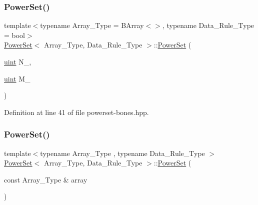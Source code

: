 \mbox{\label{class_power_set_abf6ac4224da7ae4d187d0d63833615b1}} 
\subsubsection{\texorpdfstring{Power\+Set()}{PowerSet()}\hspace{0.1cm}{\footnotesize\ttfamily [2/3]}}
{\footnotesize\ttfamily template$<$typename Array\+\_\+\+Type  = B\+Array$<$$>$, typename Data\+\_\+\+Rule\+\_\+\+Type  = bool$>$ \\
\hyperlink{class_power_set}{Power\+Set}$<$ Array\+\_\+\+Type, Data\+\_\+\+Rule\+\_\+\+Type $>$\+::\hyperlink{class_power_set}{Power\+Set} (\begin{DoxyParamCaption}\item[{\hyperlink{typedefs_8hpp_a91ad9478d81a7aaf2593e8d9c3d06a14}{uint}}]{N\+\_\+,  }\item[{\hyperlink{typedefs_8hpp_a91ad9478d81a7aaf2593e8d9c3d06a14}{uint}}]{M\+\_\+ }\end{DoxyParamCaption})\hspace{0.3cm}{\ttfamily [inline]}}



Definition at line 41 of file powerset-\/bones.\+hpp.

\mbox{\label{class_power_set_acc20a68ff11aa1891d9a0676ed50808f}} 
\subsubsection{\texorpdfstring{Power\+Set()}{PowerSet()}\hspace{0.1cm}{\footnotesize\ttfamily [3/3]}}
{\footnotesize\ttfamily template$<$typename Array\+\_\+\+Type , typename Data\+\_\+\+Rule\+\_\+\+Type $>$ \\
\hyperlink{class_power_set}{Power\+Set}$<$ Array\+\_\+\+Type, Data\+\_\+\+Rule\+\_\+\+Type $>$\+::\hyperlink{class_power_set}{Power\+Set} (\begin{DoxyParamCaption}\item[{const Array\+\_\+\+Type \&}]{array }\end{DoxyParamCaption})\hspace{0.3cm}{\ttfamily [inline]}}



